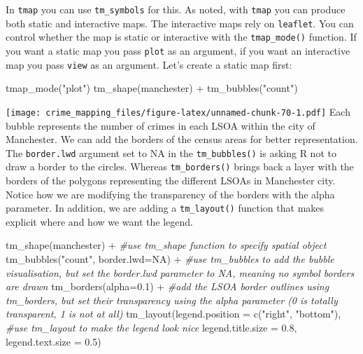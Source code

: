 \documentclass[
]{book}
\newenvironment{Shaded}{\begin{snugshade}}{\end{snugshade}}
\newcommand{\AttributeTok}[1]{\textcolor[rgb]{0.77,0.63,0.00}{#1}}
\newcommand{\CommentTok}[1]{\textcolor[rgb]{0.56,0.35,0.01}{\textit{#1}}}
\newcommand{\ConstantTok}[1]{\textcolor[rgb]{0.00,0.00,0.00}{#1}}
\newcommand{\FloatTok}[1]{\textcolor[rgb]{0.00,0.00,0.81}{#1}}
\newcommand{\FunctionTok}[1]{\textcolor[rgb]{0.00,0.00,0.00}{#1}}
\newcommand{\NormalTok}[1]{#1}
\newcommand{\SpecialCharTok}[1]{\textcolor[rgb]{0.00,0.00,0.00}{#1}}
\newcommand{\StringTok}[1]{\textcolor[rgb]{0.31,0.60,0.02}{#1}}
\begin{document}
In \texttt{tmap} you can use \texttt{tm\_symbols} for this. As noted, with \texttt{tmap} you can produce both static and interactive maps. The interactive maps rely on \texttt{leaflet}. You can control whether the map is static or interactive with the \texttt{tmap\_mode()} function. If you want a static map you pass \texttt{plot} as an argument, if you want an interactive map you pass \texttt{view} as an argument. Let's create a static map first:

\begin{Shaded}
\begin{Highlighting}[]
\FunctionTok{tmap\_mode}\NormalTok{(}\StringTok{"plot"}\NormalTok{)}
\FunctionTok{tm\_shape}\NormalTok{(manchester) }\SpecialCharTok{+} 
  \FunctionTok{tm\_bubbles}\NormalTok{(}\StringTok{"count"}\NormalTok{)}
\end{Highlighting}
\end{Shaded}

\texttt{[image: crime\_mapping\_files/figure-latex/unnamed-chunk-70-1.pdf]}
Each bubble represents the number of crimes in each LSOA within the city of Manchester. We can add the borders of the census areas for better representation. The \texttt{border.lwd} argument set to NA in the \texttt{tm\_bubbles()} is asking R not to draw a border to the circles. Whereas \texttt{tm\_borders()} brings back a layer with the borders of the polygons representing the different LSOAs in Manchester city. Notice how we are modifying the transparency of the borders with the alpha parameter. In addition, we are adding a \texttt{tm\_layout()} function that makes explicit where and how we want the legend.

\begin{Shaded}
\begin{Highlighting}[]
\FunctionTok{tm\_shape}\NormalTok{(manchester) }\SpecialCharTok{+}                         \CommentTok{\#use tm\_shape function to specify spatial object}
  \FunctionTok{tm\_bubbles}\NormalTok{(}\StringTok{"count"}\NormalTok{, }\AttributeTok{border.lwd=}\ConstantTok{NA}\NormalTok{) }\SpecialCharTok{+}              \CommentTok{\#use tm\_bubbles to add the bubble visualisation, but set the \textquotesingle{}border.lwd\textquotesingle{} parameter to NA, meaning no symbol borders are drawn}
  \FunctionTok{tm\_borders}\NormalTok{(}\AttributeTok{alpha=}\FloatTok{0.1}\NormalTok{) }\SpecialCharTok{+}                           \CommentTok{\#add the LSOA border outlines using tm\_borders, but set their transparency using the alpha parameter (0 is totally transparent, 1 is not at all)}
  \FunctionTok{tm\_layout}\NormalTok{(}\AttributeTok{legend.position =} \FunctionTok{c}\NormalTok{(}\StringTok{"right"}\NormalTok{, }\StringTok{"bottom"}\NormalTok{), }\CommentTok{\#use tm\_layout to make the legend look nice}
            \AttributeTok{legend.title.size =} \FloatTok{0.8}\NormalTok{,}
            \AttributeTok{legend.text.size =} \FloatTok{0.5}\NormalTok{)}
\end{Highlighting}
\end{Shaded}
\end{document}
